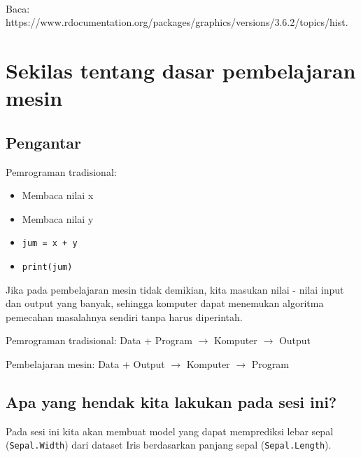 \documentclass[11pt]{article}
\providecommand{\tightlist}{%
      \setlength{\itemsep}{0pt}\setlength{\parskip}{0pt}}
\begin{document}
    \begin{center}
    \end{center}
    { \hspace*{\fill} \\}
    
    Baca:
https://www.rdocumentation.org/packages/graphics/versions/3.6.2/topics/hist.

    \hypertarget{sekilas-tentang-dasar-pembelajaran-mesin}{%
\section{Sekilas tentang dasar pembelajaran
mesin}\label{sekilas-tentang-dasar-pembelajaran-mesin}}

    \hypertarget{pengantar}{%
\subsection{Pengantar}\label{pengantar}}

    Pemrograman tradisional:

\begin{itemize}
\tightlist
\item
  Membaca nilai x\\
\item
  Membaca nilai y\\
\item
  \texttt{jum\ =\ x\ +\ y}
\item
  \texttt{print(jum)}
\end{itemize}

Jika pada pembelajaran mesin tidak demikian, kita masukan nilai - nilai
input dan output yang banyak, sehingga komputer dapat menemukan
algoritma pemecahan masalahnya sendiri tanpa harus diperintah.

Pemrograman tradisional: Data + Program \(\rightarrow\) Komputer
\(\rightarrow\) Output

Pembelajaran mesin: Data + Output \(\rightarrow\) Komputer
\(\rightarrow\) Program

\hypertarget{apa-yang-hendak-kita-lakukan-pada-sesi-ini}{%
\subsection{Apa yang hendak kita lakukan pada sesi
ini?}\label{apa-yang-hendak-kita-lakukan-pada-sesi-ini}}

Pada sesi ini kita akan membuat model yang dapat memprediksi lebar sepal
(\texttt{Sepal.Width}) dari dataset Iris berdasarkan panjang sepal
(\texttt{Sepal.Length}).
\end{document}
